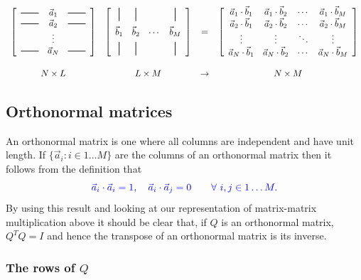 \documentclass[a4paper]{article}
\newcommand{\hmatrixrule}{\rule[0.5ex]{2em}{0.7pt}}
\newcommand{\vmatrixrule}{\rule[-0.5ex]{0.7pt}{1.5em}}
\newcommand{\highlight}[1]{{\color{blue}#1}}
\begin{document}
\[
\begin{array}{cccc}
\left[
	\begin{array}{ccc}
		\hmatrixrule & \vec{a}_1 & \hmatrixrule \\
		\hmatrixrule & \vec{a}_2 & \hmatrixrule \\
		            & \vdots & \\
		\hmatrixrule & \vec{a}_N & \hmatrixrule
	\end{array}
\right] &
\left[
	\begin{array}{cccc}
		\vmatrixrule & \vmatrixrule &  & \vmatrixrule \\[1ex]
		\vec{b}_1 & \vec{b}_2 & \cdots & \vec{b}_M \\[1ex]
		\vmatrixrule & \vmatrixrule &  & \vmatrixrule 
	\end{array}
\right] &
= &
\left[
	\begin{array}{cccc}
\vec{a}_1 \cdot \vec{b}_1 & \vec{a}_1 \cdot \vec{b}_2 & \cdots & \vec{a}_1 \cdot \vec{b}_M \\
\vec{a}_2 \cdot \vec{b}_1 & \vec{a}_2 \cdot \vec{b}_2 & \cdots & \vec{a}_2 \cdot \vec{b}_M \\
\vdots & \vdots & \ddots & \vdots \\
\vec{a}_N \cdot \vec{b}_1 & \vec{a}_N \cdot \vec{b}_2 & \cdots & \vec{a}_N \cdot \vec{b}_M 
	\end{array}
\right]
\\
\rule{0pt}{2em} N \times L & L \times M & \rightarrow & N \times M
\end{array}
\]

\subsection{Orthonormal matrices}

An orthonormal matrix is one where all columns are \highlight{independent} and
\highlight{have unit length}. If $\{ \vec{a}_i : i \in 1 \dots M \}$ are the
columns of an orthonormal matrix then it follows from the definition that
\[\highlight{
  \vec{a}_i \cdot \vec{a}_i = 1, \quad \vec{a}_i \cdot \vec{a}_j = 0 \qquad
  \forall \  i, j \in 1 \dots M.
}\]
By using this result and looking at our representation of matrix-matrix
multiplication above it should be clear that, if $Q$ is an orthonormal matrix,
$Q^TQ = I$ and hence \highlight{the transpose of an orthonormal matrix is its
inverse}.

\subsubsection{The rows of $Q$}
\end{document}
